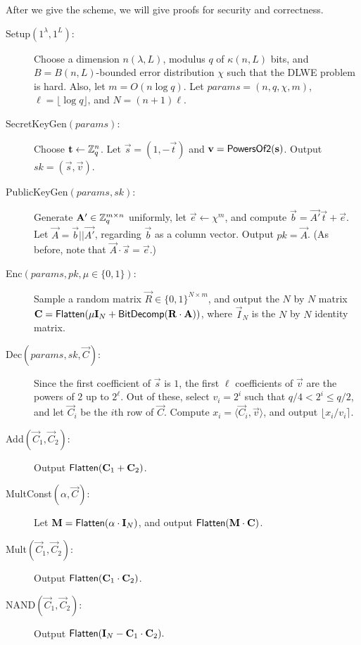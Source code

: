     After we give the scheme, we will give proofs for security and correctness.

    \begin{description}
        \item[Setup$(1^\lambda, 1^L)$:] Choose a dimension $n(\lambda, L)$, modulus $q$ of $\kappa(n, L)$ bits, and $B = B(n, L)$-bounded error distribution $\chi$ such that the DLWE problem is hard. Also, let $m = O(n \log q)$. Let $\textit{params} = (n, q, \chi, m)$, $\ell = \lfloor \log q \rfloor$, and $N = (n + 1) \ell$.

        \item[SecretKeyGen$(params)$:] Choose $\vec{t} \leftarrow \Z_q^n$. Let $\vec{s} = (1, -\vec{t})$ and  $\vec{v} = {\sf PowersOf2}(\vec{s})$. Output $sk = (\vec{s}, \vec{v})$.

        \item[PublicKeyGen$(params,sk)$:] Generate $\vec{A'} \in \Z_q^{m \times n}$ uniformly, let $\vec{e} \leftarrow \chi^m$, and compute $\vec{b} = \vec{A'} \vec{t} + \vec{e}$. Let $\vec{A} = \vec{b} || \vec{A'}$, regarding $\vec{b}$ as a column vector. Output $pk = \vec{A}$.
        (As before, note that $\vec{A} \cdot \vec{s} = \vec{e}$.)

        \item[Enc$(params, pk, \mu \in \{0, 1\})$:] Sample a random matrix $\vec{R} \in \{0,1\}^{N \times m}$, and output the $N$ by $N$ matrix $\vec{C} = {\sf Flatten}(\mu \vec{I}_N + {\sf BitDecomp}(\vec{R} \cdot \vec{A}))$, where $\vec{I}_N$ is the $N$ by $N$ identity matrix.

        \item[Dec$(params, sk, \vec{C})$:] Since the first coefficient of $\vec{s}$ is $1$, the first $\ell$ coefficients of $\vec{v}$ are the powers of $2$ up to $2^\ell$. Out of these, select $v_i = 2^i$ such that $q/4 < 2^i \leq q/2$, and let $\vec{C}_i$ be the $i$th row of $\vec{C}$. Compute $x_i = \langle \vec{C}_i, \vec{v} \rangle$,
        and output $\lfloor x_i / v_i \rceil$.

        \item[Add$(\vec{C}_1, \vec{C}_2)$:] Output ${\sf Flatten}(\vec{C}_1 + \vec{C}_2)$.

        \item[MultConst$(\alpha, \vec{C})$:] Let $\vec{M} = {\sf Flatten}(\alpha \cdot \vec{I}_N)$, and output ${\sf Flatten}(\vec{M} \cdot \vec{C})$.

        \item[Mult$(\vec{C}_1, \vec{C}_2)$:] Output ${\sf Flatten}(\vec{C}_1 \cdot \vec{C}_2)$.

        \item[NAND$(\vec{C}_1, \vec{C}_2):$] Output ${\sf Flatten}(\vec{I}_N - \vec{C}_1 \cdot \vec{C}_2).$

    \end{description}

